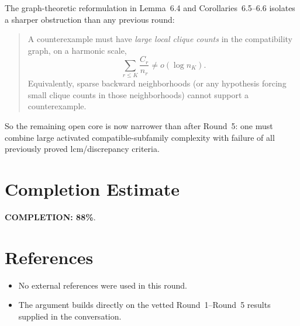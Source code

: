 The graph-theoretic reformulation in Lemma~6.4 and Corollaries~6.5--6.6 isolates a sharper obstruction than any previous round:
\begin{quote}
A counterexample must have \emph{large local clique counts} in the compatibility graph, on a harmonic scale,
\[
\sum_{r\le K}\frac{C_r}{n_r}\not=o(\log n_K).
\]
Equivalently, sparse backward neighborhoods (or any hypothesis forcing small clique counts in those neighborhoods) cannot support a counterexample.
\end{quote}
So the remaining open core is now narrower than after Round~5: one must combine large activated compatible-subfamily complexity with failure of all previously proved lcm/discrepancy criteria.

\section{Completion Estimate}
\textbf{COMPLETION: 88\%}.

\section{References}
\begin{itemize}
\item No external references were used in this round.
\item The argument builds directly on the vetted Round~1--Round~5 results supplied in the conversation.
\end{itemize}
